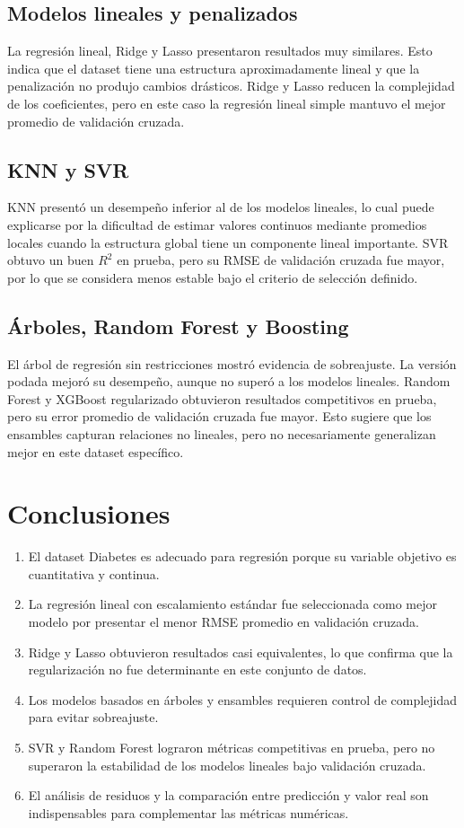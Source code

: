 \documentclass[12pt,letterpaper]{article}
\begin{document}
\subsection{Modelos lineales y penalizados}
La regresión lineal, Ridge y Lasso presentaron resultados muy similares. Esto indica que el dataset tiene una estructura aproximadamente lineal y que la penalización no produjo cambios drásticos. Ridge y Lasso reducen la complejidad de los coeficientes, pero en este caso la regresión lineal simple mantuvo el mejor promedio de validación cruzada.

\subsection{KNN y SVR}
KNN presentó un desempeño inferior al de los modelos lineales, lo cual puede explicarse por la dificultad de estimar valores continuos mediante promedios locales cuando la estructura global tiene un componente lineal importante. SVR obtuvo un buen $R^2$ en prueba, pero su RMSE de validación cruzada fue mayor, por lo que se considera menos estable bajo el criterio de selección definido.

\subsection{Árboles, Random Forest y Boosting}
El árbol de regresión sin restricciones mostró evidencia de sobreajuste. La versión podada mejoró su desempeño, aunque no superó a los modelos lineales. Random Forest y XGBoost regularizado obtuvieron resultados competitivos en prueba, pero su error promedio de validación cruzada fue mayor. Esto sugiere que los ensambles capturan relaciones no lineales, pero no necesariamente generalizan mejor en este dataset específico.

\section{Conclusiones}
\begin{enumerate}
    \item El dataset Diabetes es adecuado para regresión porque su variable objetivo es cuantitativa y continua.
    \item La regresión lineal con escalamiento estándar fue seleccionada como mejor modelo por presentar el menor RMSE promedio en validación cruzada.
    \item Ridge y Lasso obtuvieron resultados casi equivalentes, lo que confirma que la regularización no fue determinante en este conjunto de datos.
    \item Los modelos basados en árboles y ensambles requieren control de complejidad para evitar sobreajuste.
    \item SVR y Random Forest lograron métricas competitivas en prueba, pero no superaron la estabilidad de los modelos lineales bajo validación cruzada.
    \item El análisis de residuos y la comparación entre predicción y valor real son indispensables para complementar las métricas numéricas.
\end{enumerate}
\end{document}
